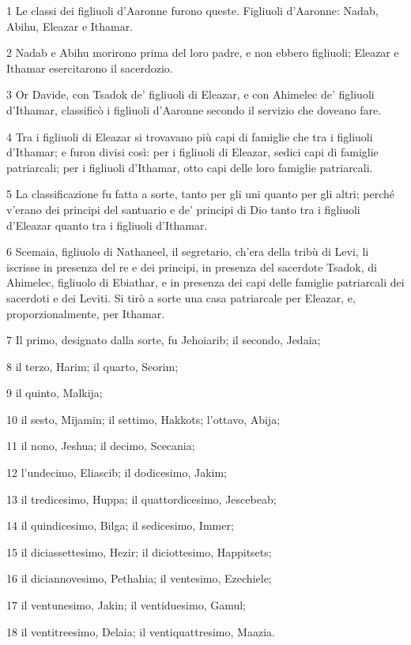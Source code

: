 \par 1 Le classi dei figliuoli d'Aaronne furono queste. Figliuoli d'Aaronne: Nadab, Abihu, Eleazar e Ithamar.
\par 2 Nadab e Abihu morirono prima del loro padre, e non ebbero figliuoli; Eleazar e Ithamar esercitarono il sacerdozio.
\par 3 Or Davide, con Tsadok de' figliuoli di Eleazar, e con Ahimelec de' figliuoli d'Ithamar, classificò i figliuoli d'Aaronne secondo il servizio che doveano fare.
\par 4 Tra i figliuoli di Eleazar si trovavano più capi di famiglie che tra i figliuoli d'Ithamar; e furon divisi così: per i figliuoli di Eleazar, sedici capi di famiglie patriarcali; per i figliuoli d'Ithamar, otto capi delle loro famiglie patriarcali.
\par 5 La classificazione fu fatta a sorte, tanto per gli uni quanto per gli altri; perché v'erano dei principi del santuario e de' principi di Dio tanto tra i figliuoli d'Eleazar quanto tra i figliuoli d'Ithamar.
\par 6 Scemaia, figliuolo di Nathaneel, il segretario, ch'era della tribù di Levi, li iscrisse in presenza del re e dei principi, in presenza del sacerdote Tsadok, di Ahimelec, figliuolo di Ebiathar, e in presenza dei capi delle famiglie patriarcali dei sacerdoti e dei Leviti. Si tirò a sorte una casa patriarcale per Eleazar, e, proporzionalmente, per Ithamar.
\par 7 Il primo, designato dalla sorte, fu Jehoiarib; il secondo, Jedaia;
\par 8 il terzo, Harim; il quarto, Seorim;
\par 9 il quinto, Malkija;
\par 10 il sesto, Mijamin; il settimo, Hakkots; l'ottavo, Abija;
\par 11 il nono, Jeshua; il decimo, Scecania;
\par 12 l'undecimo, Eliascib; il dodicesimo, Jakim;
\par 13 il tredicesimo, Huppa; il quattordicesimo, Jescebeab;
\par 14 il quindicesimo, Bilga; il sedicesimo, Immer;
\par 15 il diciassettesimo, Hezir; il diciottesimo, Happitsets;
\par 16 il diciannovesimo, Pethahia; il ventesimo, Ezechiele;
\par 17 il ventunesimo, Jakin; il ventiduesimo, Gamul;
\par 18 il ventitreesimo, Delaia; il ventiquattresimo, Maazia.

